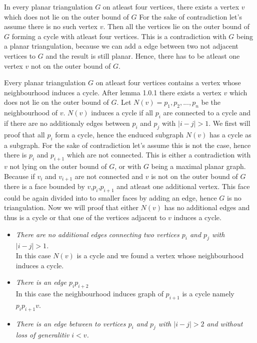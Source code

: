\documentclass[a4paper]{article}
\begin{document}
	\begin{solution}{21}
		\begin{lemma}{In every planar triangulation $G$ on atleast four vertices, there exists a vertex $v$ which does not lie on the outer bound of $G$}
		For the sake of contradiction let's assume there is no such vertex $v$. 
		Then all the vertices lie on the outer bound of $G$ forming a cycle with atleast four vertices. 
		This is a contradiction with $G$ being a planar triangulation, because we can add a edge between two not adjacent vertices to $G$ and the result is still planar. 
		Hence, there has to be atleast one vertex $v$ not on the outer bound of $G$. 
		\end{lemma}
	
		\begin{theorem}{Every planar triangulation $G$ on atleast four vertices contains a vertex whose neighbourhood induces a cycle.}
		After lemma 1.0.1 there exists a vertex $v$ which does not lie on the outer bound of $G$. 
		Let $N(v) = {p_1,p_2,...,p_n}$ be the neighbourhood of $v$. 
		$N(v)$ induces a cycle if all $p_i$ are connected to a cycle and if there are no additionaly edges between $p_i$ and $p_j$ with $|i-j|>1$.  
		We first will proof that all $p_i$ form a cycle, hence the enduced subgraph $N(v)$ has a cycle as a subgraph. 
		For the sake of contradiction let's assume this is not the case, hence there is $p_i$ and $p_{i+1}$ which are not connected. 
		This is either a contradiction with $v$ not lying on the outer bound of $G$, or with $G$ being a maximal planar graph. 
		Because if $v_i$ and $v_{i+1}$ are not connected and $v$ is not on the outer bound of $G$ there is a face bounded by $v$,$p_i$,$p_{i+1}$ and atleast one additional vertex. 
		This face could be again divided into to smaller faces by adding an edge, hence $G$ is no triangulation. 
		Now we will proof that either $N(v)$ has no additional edges and thus is a cycle or that one of the vertices adjacent to $v$ induces a cycle. 
		\begin{itemize}
			\item \emph{There are no additional edges connecting two vertices $p_i$ and $p_j$ with $|i-j|>1$.} \\
				In this case $N(v)$ is a cycle and we found a vertex whose neighbourhood induces a cycle.
			\item \emph{There is an edge $p_ip_{i+2}$}\\
				In this case the neighbourhood induces graph of $p_{i+1}$ is a cycle namely $p_i p_{i+1} v$. 
			\item \emph{There is an edge between to vertices $p_i$ and $p_j$ with $|i-j| > 2$  and without loss of generalitiv $i<v$.}\\

\end{itemize}
\end{theorem}
\end{solution}
\end{document}
